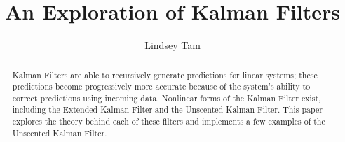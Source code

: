 \documentclass{pom_thesis}
\title{An Exploration of Kalman Filters}
\author{Lindsey Tam }
\begin{document}
\maketitle

\begin{abstract}
	Kalman Filters are able to recursively generate predictions for linear systems; these predictions become progressively more accurate because of the system's ability to correct predictions using incoming data. Nonlinear forms of the Kalman Filter exist, including the Extended Kalman Filter and the Unscented Kalman Filter. This paper explores the theory behind each of these filters and implements a few examples of the Unscented Kalman Filter.
\end{abstract}

\tableofcontents











%

\newpage






\appendix

\end{document}
